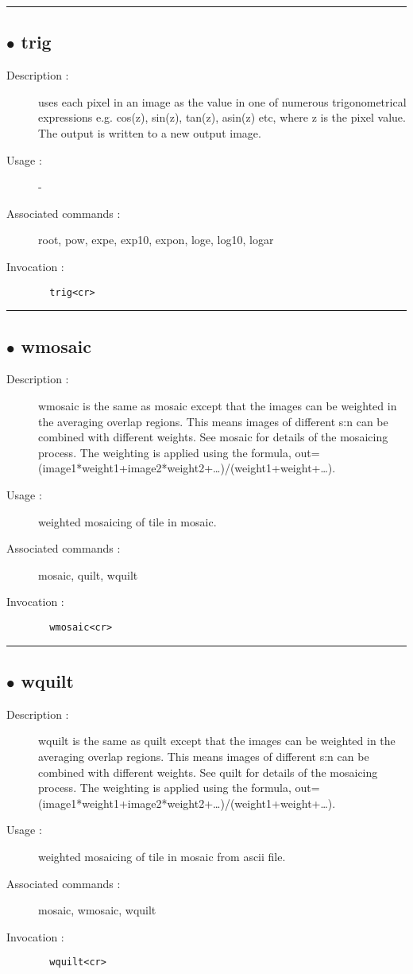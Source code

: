 \hrule \subsection*{$\bullet$ trig}
\begin{description}
\item[Description :] uses each pixel in an image as the value in one of numerous
trigonometrical expressions e.g. cos(z), sin(z), tan(z), asin(z) etc,
where z is the pixel value.  The output is written to a new output image.
\item[Usage :] -
\item[Associated commands :] root, pow, expe, exp10, expon, loge, log10, logar
\item[Invocation :]

\verb+  trig<cr> +\end{description}

\hrule \subsection*{$\bullet$ wmosaic}
\begin{description}
\item[Description :] wmosaic is the same as mosaic except that the images can be
weighted in the averaging overlap regions.  This means images of
different s:n can be combined with different weights.  See mosaic for
details of the mosaicing process.  The weighting is applied using the
formula, out=(image1*weight1+image2*weight2+\ldots)/(weight1+weight+\ldots).
\item[Usage :] weighted mosaicing of tile in mosaic.
\item[Associated commands :] mosaic, quilt, wquilt
\item[Invocation :]

\verb+  wmosaic<cr> +\end{description}

\hrule \subsection*{$\bullet$ wquilt}
\begin{description}
\item[Description :] wquilt is the same as quilt except that the images can be
weighted in the averaging overlap regions.  This means images of
different s:n can be combined with different weights.  See quilt for
details of the mosaicing process. The weighting is applied using the
formula, out=(image1*weight1+image2*weight2+\ldots)/(weight1+weight+\ldots).
\item[Usage :] weighted mosaicing of tile in mosaic from ascii file.
\item[Associated commands :] mosaic, wmosaic, wquilt
\item[Invocation :]

\verb+  wquilt<cr> +\end{description}

